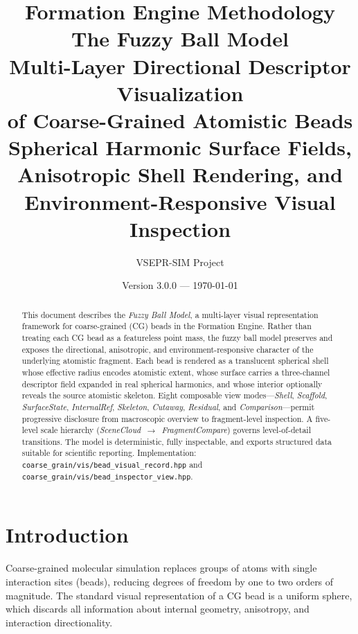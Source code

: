 \documentclass[12pt, a4paper, oneside]{article}
\title{%
  \textbf{Formation Engine Methodology}\\[6pt]
  \textbf{The Fuzzy Ball Model}\\[10pt]
  \large Multi-Layer Directional Descriptor Visualization\\
  of Coarse-Grained Atomistic Beads\\[4pt]
  \normalsize Spherical Harmonic Surface Fields, Anisotropic Shell Rendering,
              and Environment-Responsive Visual Inspection
}
\author{%
  VSEPR-SIM Project%
}
\date{Version 3.0.0 — \today}
\newcommand{\file}[1]{\texttt{#1}}
\begin{document}
\maketitle

\begin{abstract}
This document describes the \emph{Fuzzy Ball Model}, a multi-layer visual
representation framework for coarse-grained (CG) beads in the Formation
Engine.  Rather than treating each CG bead as a featureless point mass,
the fuzzy ball model preserves and exposes the directional, anisotropic,
and environment-responsive character of the underlying atomistic fragment.
Each bead is rendered as a translucent spherical shell whose effective
radius encodes atomistic extent, whose surface carries a three-channel
descriptor field expanded in real spherical harmonics, and whose interior
optionally reveals the source atomistic skeleton.  Eight composable view
modes---\emph{Shell}, \emph{Scaffold}, \emph{SurfaceState},
\emph{InternalRef}, \emph{Skeleton}, \emph{Cutaway}, \emph{Residual}, and
\emph{Comparison}---permit progressive disclosure from macroscopic overview
to fragment-level inspection.  A five-level scale hierarchy
(\emph{SceneCloud}~$\to$~\emph{FragmentCompare}) governs level-of-detail
transitions.  The model is deterministic, fully inspectable, and exports
structured data suitable for scientific reporting.  Implementation:
\file{coarse\_grain/vis/bead\_visual\_record.hpp} and
\file{coarse\_grain/vis/bead\_inspector\_view.hpp}.
\end{abstract}

\tableofcontents
\newpage

\section{Introduction}

Coarse-grained molecular simulation replaces groups of atoms with
single interaction sites (beads), reducing degrees of freedom by one
to two orders of magnitude.  The standard visual representation of a
CG bead is a uniform sphere, which discards all information about
internal geometry, anisotropy, and interaction directionality.
\end{document}
